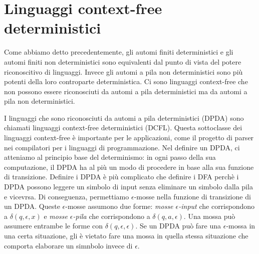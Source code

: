 \documentclass[12pt]{report}
\begin{document}
\section{Linguaggi context-free deterministici}
Come abbiamo detto precedentemente, gli automi finiti deterministici e gli automi finiti non deterministici sono equivalenti dal punto di vista del potere riconoscitivo di linguaggi. Invece gli automi a pila non deterministici sono più potenti della loro controparte deterministica. Ci sono linguaggi context-free che non possono essere riconosciuti da automi a pila deterministici ma da automi a pila non deterministici.

I linguaggi che sono riconosciuti da automi a pila deterministici (DPDA) sono chiamati linguaggi context-free deterministici (DCFL). Questa sottoclasse dei linguaggi context-free è importante per le applicazioni, come il progetto di parser nei compilatori per i linguaggi di programmazione. Nel definire un DPDA, ci atteniamo al principio base del determinismo: in ogni passo della sua computazione, il DPDA ha al più un modo di procedere in base alla sua funzione di transizione. Definire i DPDA è più complicato che definire i DFA perchè i DPDA possono leggere un simbolo di input senza eliminare un simbolo dalla pila e vicevrsa. Di conseguenza, permettiamo $\epsilon$-mosse nella funzione di transizione di un DPDA. Queste $\epsilon$-mosse assumono due forme: \textit{mosse $\epsilon$-input} che corrispondono a  $\delta(q, \epsilon, x)$ e \textit{mosse $\epsilon$-pila} che corrispondono a $\delta(q, a, \epsilon)$. Una mossa può assumere entrambe le forme con $\delta(q, \epsilon, \epsilon)$. Se un DPDA può fare una $\epsilon$-mossa in una certa situazione, gli è vietato fare una mossa in quella stessa situazione che comporta elaborare un simnbolo invece di $\epsilon$.
\end{document}
